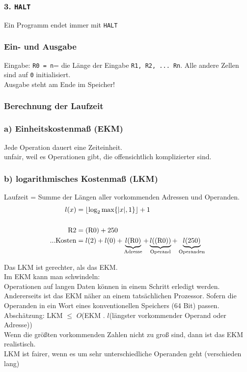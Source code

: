 \subsubsection*{3. \lstinline!HALT!}
Ein Programm endet immer mit \lstinline!HALT!
\subsubsection*{Ein- und Ausgabe}
Eingabe: \lstinline!R0 = n!= die Länge der Eingabe \lstinline!R1, R2, ... Rn!. Alle andere Zellen sind auf \lstinline!0! initialisiert.\\
Ausgabe steht am Ende im Speicher!\\

\subsubsection{Berechnung der Laufzeit}
\subsubsection*{a) Einheitskostenmaß (EKM)}
Jede Operation dauert eine Zeiteinheit.\\unfair, weil es Operationen gibt, die offensichtlich komplizierter sind.
\subsubsection*{b) logarithmisches Kostenmaß (LKM)}
Laufzeit = Summe der Längen aller vorkommenden Adressen und Operanden.
\begin{align*}
l (x) &= \lfloor \log_2 \max \{|x|,1\} \rfloor +1\\
\\
\text{\lstinline!R2!} &= (\text{\lstinline!R0!}) + 250\\
\text{...Kosten} &= l(2) + l(0) + \underbrace{l(\text{\lstinline!R0!})}_\text{Adresse} + \underbrace{l((\text{\lstinline!R0!}))}_\text{Operand}+\underbrace{l(250)}_\text{Operanden}
\end{align*}

Das LKM ist gerechter, als das EKM.\\

Im EKM kann man schwindeln:\\
Operationen auf langen Daten können in einem Schritt erledigt werden.\\
Andererseits ist das EKM näher an einem tatsächlichen Prozessor. Sofern die Operanden in ein Wort eines konventionellen Speichers (64 Bit) passen.\\
Abschätzung: LKM $\leq$ $O$(EKM . $l$(längster vorkommender Operand oder Adresse))\\
Wenn die größten vorkommenden Zahlen nicht zu groß sind, dann ist das EKM realistisch.\\
LKM ist fairer, wenn es um sehr unterschiedliche Operanden geht (verschieden lang)\\

